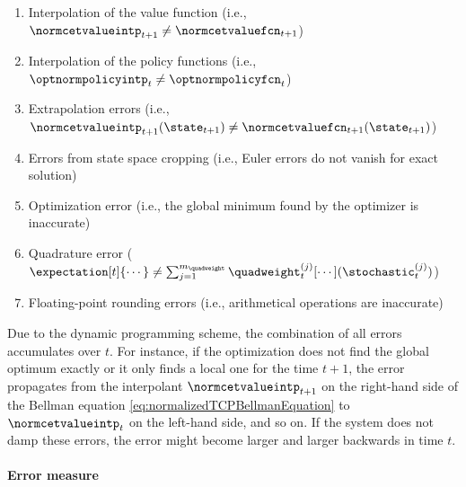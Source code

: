 \begin{enumerate}[
  label=E\arabic*.,
  ref=E\arabic*,
  leftmargin=2.7em,
  itemsep=-0.3em,
]
  \item
  \label{item:financeErrorInterpolationValue}
  Interpolation of the value function
  (i.e., $\normcetvalueintp_{t+1} \not= \normcetvaluefcn_{t+1}$)
  
  \item
  \label{item:financeErrorInterpolationPolicy}
  Interpolation of the policy functions
  (i.e., $\optnormpolicyintp_t \not= \optnormpolicyfcn_t$)
  
  \item
  \label{item:financeErrorExtrapolation}
  Extrapolation errors
  (i.e., $
  \normcetvalueintp_{t+1}(\state_{t+1})
  \not= \normcetvaluefcn_{t+1}(\state_{t+1})
  $)
  
  \item
  \label{item:financeErrorCropping}
  Errors from state space cropping
  (i.e., Euler errors do not vanish for exact solution)
  
  \item
  \label{item:financeErrorOptimization}
  Optimization error
  (i.e., the global minimum found by the optimizer is inaccurate)
  
  \item
  \label{item:financeErrorQuadrature}
  Quadrature error
  ($
  \expectation[t]{\cdots}
  \not= \sum_{j=1}^{m_{\quadweight}} \quadweight_t^{(j)}
  [\cdots](\stochastic_t^{(j)})
  $)
  
  \item
  \label{item:financeErrorRounding}
  Floating-point rounding errors
  (i.e., arithmetical operations are inaccurate)
\end{enumerate}
Due to the dynamic programming scheme,
the combination of all errors accumulates over $t$.
For instance, if the optimization does not find the global optimum
exactly or it only finds a local one for the time $t + 1$,
the error propagates from the interpolant $\normcetvalueintp_{t+1}$
on the right-hand side of the Bellman equation
\eqref{eq:normalizedTCPBellmanEquation} to $\normcetvalueintp_t$
on the left-hand side, and so on.
If the system does not damp these errors,
the error might become larger and larger backwards in time $t$.

\paragraph{Error measure}


